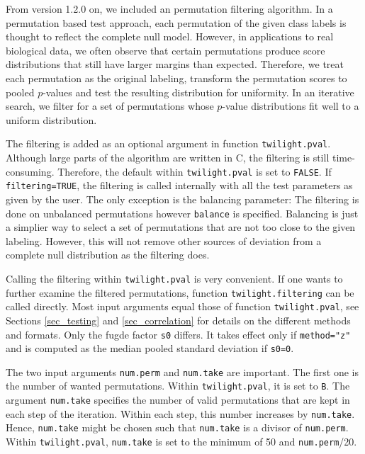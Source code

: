 \documentclass[11pt,a4paper,fleqn]{report}
\newcommand{\Rfunction}[1]{{\texttt{#1}}}
\newcommand{\Rfunarg}[1]{{\texttt{#1}}}
\begin{document}
From version 1.2.0 on, we included an permutation filtering algorithm. In a permutation based test approach, each permutation of the given class labels is thought to reflect the complete null model. However, in applications to real biological data, we often observe that certain permutations produce score distributions that still have larger margins than expected. Therefore, we treat each permutation as the original labeling, transform the permutation scores to pooled $p$-values and test the resulting distribution for uniformity. In an iterative search, we filter for a set of permutations whose $p$-value distributions fit well to a uniform distribution.

The filtering is added as an optional argument in function \Rfunction{twilight.pval}. Although large parts of the algorithm are written in C, the filtering is still time-consuming. Therefore, the default within \Rfunction{twilight.pval} is set to \Rfunarg{FALSE}. If \Rfunarg{filtering=TRUE}, the filtering is called internally with all the test parameters as given by the user. The only exception is the balancing parameter: The filtering is done on unbalanced permutations however \Rfunarg{balance} is specified. Balancing is just a simplier way to select a set of permutations that are not too close to the given labeling. However, this will not remove other sources of deviation from a complete null distribution as the filtering does.

Calling the filtering within \Rfunction{twilight.pval} is very convenient. If one wants to further examine the filtered permutations, function \Rfunarg{twilight.filtering} can be called directly. Most input arguments equal those of function \Rfunarg{twilight.pval}, see Sections \ref{sec_testing} and \ref{sec_correlation} for details on the different methods and formats. Only the fugde factor \Rfunarg{s0} differs. It takes effect only if \Rfunarg{method="z"} and is computed as the median pooled standard deviation if \Rfunarg{s0=0}.

The two input arguments \Rfunarg{num.perm} and \Rfunarg{num.take} are important. The first one is the number of wanted permutations. Within \Rfunction{twilight.pval}, it is set to \Rfunarg{B}. The argument \Rfunarg{num.take} specifies the number of valid permutations that are kept in each step of the iteration. Within each step, this number increases by \Rfunarg{num.take}. Hence, \Rfunarg{num.take} might be chosen such that \Rfunarg{num.take} is a divisor of \Rfunarg{num.perm}. Within \Rfunction{twilight.pval}, \Rfunarg{num.take} is set to the minimum of 50 and \Rfunarg{num.perm}/20.       
\end{document}
